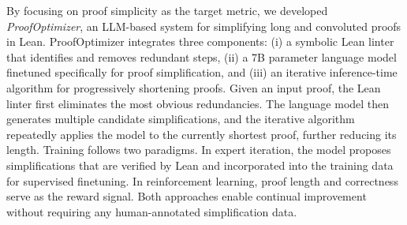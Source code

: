 %

By focusing on proof simplicity as the target metric, we developed \emph{ProofOptimizer}, an
LLM-based system for simplifying long and convoluted proofs in Lean.
ProofOptimizer integrates three components: (i) a symbolic Lean linter that identifies and
removes redundant steps, (ii) a 7B parameter language model finetuned specifically
for proof simplification, and (iii) an iterative inference-time algorithm for progressively
shortening proofs. Given an input proof, the Lean linter first eliminates the most
obvious redundancies. The language model then generates multiple candidate simplifications, and the iterative algorithm repeatedly applies the model to the currently shortest proof, further reducing its length. Training follows two paradigms. In expert iteration, the model proposes simplifications that are verified by Lean and incorporated into the training data for supervised finetuning. In reinforcement learning, proof length and correctness serve as the reward signal. Both approaches enable continual improvement without requiring any human-annotated simplification data.


